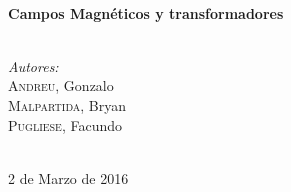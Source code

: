 \begin{titlepage}
\HRule \\[0.4cm]
{ \huge \bfseries  Campos Magnéticos y transformadores}\\[0.2cm] %
\HRule \\[1cm]
 

\begin{minipage}{0.4\textwidth}
\begin{center} \large
\emph{Autores:}\\
\textsc{Andreu}, Gonzalo\\ %
\textsc{Malpartida}, Bryan\\ %
\textsc{Pugliese}, Facundo\\ %


\end{center}
\end{minipage}
~ \\[1.25cm]





{\large 2 de Marzo de 2016}\\[1.75cm] %



\end{titlepage}
